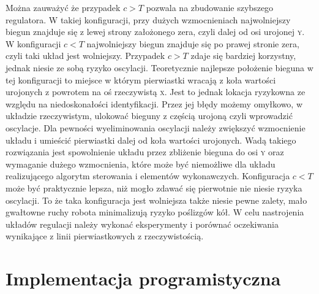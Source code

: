 \documentclass[11pt]{article}
\begin{document}
Można zauważyć że przypadek $ c > T $ pozwala na zbudowanie szybszego regulatora.
W takiej konfiguracji, przy dużych wzmocnieniach najwolniejszy biegun znajduje się z lewej strony założonego zera, czyli dalej od osi urojonej \textsc{y}.
W konfiguracji $ c < T $ najwolniejszy biegun znajduje się po prawej stronie zera, czyli taki układ jest wolniejszy.
Przypadek $ c > T $ zdaje się bardziej korzystny, jednak niesie ze sobą ryzyko oscylacji.
Teoretycznie najlepsze położenie bieguna w tej konfiguracji to miejsce w którym pierwiastki wracają z koła wartości urojonych z powrotem na oś rzeczywistą \textsc{x}.
Jest to jednak lokacja ryzykowna ze względu na niedoskonałości identyfikacji.
Przez jej błędy możemy omyłkowo, w układzie rzeczywistym, ulokować bieguny z częścią urojoną czyli wprowadzić oscylacje.
Dla pewności wyeliminowania oscylacji należy zwiększyć wzmocnienie układu i umieścić pierwiastki dalej od koła wartości urojonych.
Wadą takiego rozwiązania jest spowolnienie układu przez zbliżenie bieguna do osi \textsc{y} oraz wymaganie dużego wzmocnienia, które może być niemożliwe dla układu realizującego algorytm sterowania i elementów wykonawczych.
Konfiguracja $ c < T $ może być praktycznie lepsza, niż mogło zdawać się pierwotnie nie niesie ryzyka oscylacji.
To że taka konfiguracja jest wolniejsza także niesie pewne zalety, mało gwałtowne ruchy robota minimalizują ryzyko poślizgów kół.
W celu nastrojenia układów regulacji należy wykonać eksperymenty i porównać oczekiwania wynikające z linii pierwiastkowych z rzeczywistością.

\section{Implementacja programistyczna}
\end{document}
